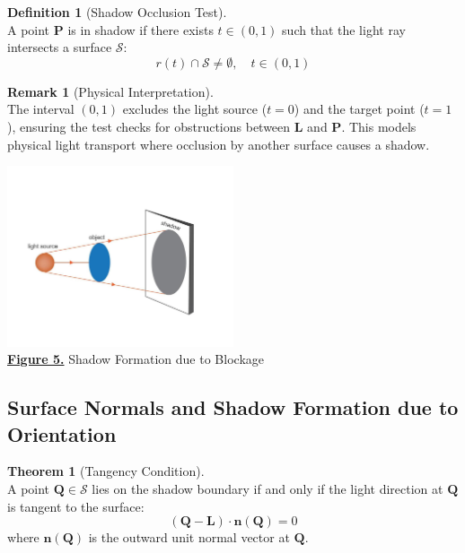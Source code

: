 \documentclass[12pt,a4paper]{article}
\theoremstyle{definition}
\newtheorem{definition}{Definition}[subsection]
\newtheorem{theorem}{Theorem}[subsection]
\newtheorem{remark}{Remark}[subsection]
\newcommand{\vect}[1]{\bm{#1}}
\begin{document}
\begin{definition}[Shadow Occlusion Test] \label{def:shadow_occlusion} ~\\
A point $\vect{P}$ is in shadow if there exists $t \in (0,1)$ such that the light ray intersects a surface $\mathcal{S}$:
\begin{equation}
\boxed{r(t) \cap \mathcal{S} \neq \emptyset, \quad t \in (0,1)}
\end{equation}
\end{definition}

\begin{remark}[Physical Interpretation] \label{rmk:occlusion_physics} ~\\
The interval $(0,1)$ excludes the light source ($t=0$) and the target point ($t=1$), ensuring the test checks for obstructions between $\vect{L}$ and $\vect{P}$. This models physical light transport where occlusion by another surface causes a shadow.
\end{remark}

\vspace{-3em}
\begin{center}
    \includegraphics[width=0.5\textwidth]{shadow-of-object-vector.jpg} \\
    \hyperlink{[Fig 5]}{\textbf{Figure 5.}} Shadow Formation due to Blockage
\end{center}

\newpage


\subsection{Surface Normals and Shadow Formation due to Orientation}
\vspace{-0.5em}
\begin{theorem}[Tangency Condition] \label{thm:tangency} ~\\
A point \(\vect{Q} \in \mathcal{S}\) lies on the shadow boundary if and only if the light direction at \(\vect{Q}\) is tangent to the surface:
\begin{equation}
\boxed{(\vect{Q} - \vect{L}) \cdot \vect{n}(\vect{Q}) = 0} \label{eq:tangency}
\end{equation}
where \(\vect{n}(\vect{Q})\) is the outward unit normal vector at \(\vect{Q}\).
\end{theorem}
\end{document}
